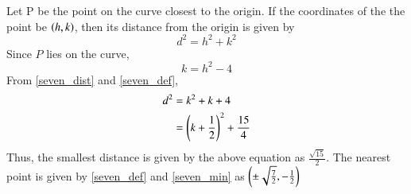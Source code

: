 Let P be the  point on the curve closest to the origin. If the coordinates of the the point be $\left(h,k\right)$, then its  distance from the origin is given by
%
\begin{equation}
\label{seven_dist}
d^2 = h^2+k^2
\end{equation}
%
Since $P$ lies on the curve, 
%
\begin{equation}
\label{seven_def}
k = h^2-4
\end{equation}
%
From \eqref{seven_dist} and \eqref{seven_def},
%
\begin{align}
\label{seven_min}
d^2 &= k^2+k+4 \nonumber \\
&= \left(k + \frac{1}{2}\right)^2 +\frac{15}{4}
\end{align}
%
Thus, the smallest distance is given by the above equation as $\frac{\sqrt{15}}{2}$. The nearest point is given by \eqref{seven_def} and \eqref{seven_min} as $\left(\pm \sqrt{\frac{7}{2}},-\frac{1}{2}\right)$

%
